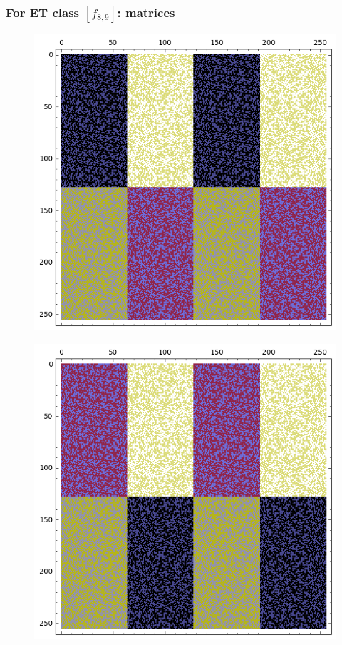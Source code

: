\documentclass[pdf,sprung,slideColor,nocolorBG]{beamer}
\begin{document}
\begin{frame}
\frametitle{For ET class $[f_{8,9}]$: matrices}
\begin{figure}
\centering
\begin{minipage}{.48\textwidth}
  \centering
  \includegraphics[width=.9\linewidth]{../matrix_plot/c8_9_bent_cayley_graph_index_matrix.png}
  \label{fig:c8_9_bent_cayley_graph_index_matrix}
\end{minipage}
\begin{minipage}{.48\textwidth}
  \centering
  \includegraphics[width=.9\linewidth]{../matrix_plot/c8_9_dual_cayley_graph_index_matrix.png}
  \label{fig:c8_9_dual_cayley_graph_index_matrix}
\end{minipage}%
\end{figure}
\end{frame}
\end{document}
